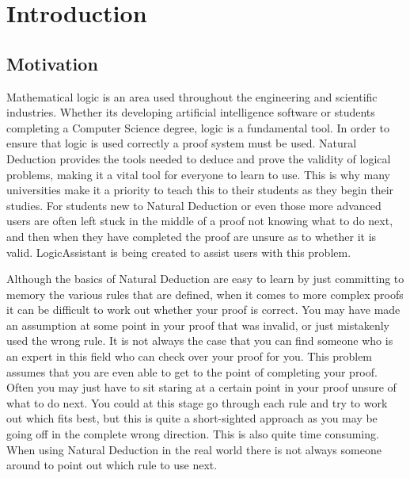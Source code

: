 

\newcommand{\reporttitle}{LogicAssistant}
\newcommand{\reportauthor}{Joshua Zeltser}
\newcommand{\supervisor}{Romain Barnoud}
\newcommand{\degreetype}{Computing}






\date{September 2015}





\pagebreak
\tableofcontents
\pagebreak

\section{Introduction}

\subsection{Motivation}

Mathematical logic is an area used throughout the engineering and scientific industries. Whether its developing artificial intelligence software or students completing a Computer Science degree, logic is a fundamental tool. In order to ensure that logic is used correctly a proof system must be used. Natural Deduction provides the tools needed to deduce and prove the validity of logical problems, making it a vital tool for everyone to learn to use. This is why many universities make it a priority to teach this to their students as they begin their studies. For students new to Natural Deduction or even those more advanced users are often left stuck in the middle of a proof not knowing what to do next, and then when they have completed the proof are unsure as to whether it is valid. LogicAssistant is being created to assist users with this problem.

Although the basics of Natural Deduction are easy to learn by just committing to memory the various rules that are defined, when it comes to more complex proofs it can be difficult to work out whether your proof is correct. You may have made an assumption at some point in your proof that was invalid, or just mistakenly used the wrong rule. It is not always the case that you can find someone who is an expert in this field who can check over your proof for you. This problem assumes that you are even able to get to the point of completing your proof. Often you may just have to sit staring at a certain point in your proof unsure of what to do next. You could at this stage go through each rule and try to work out which fits best, but this is quite a short-sighted approach as you may be going off in the complete wrong direction. This is also quite time consuming. When using Natural Deduction in the real world there is not always someone around to point out which rule to use next. 

